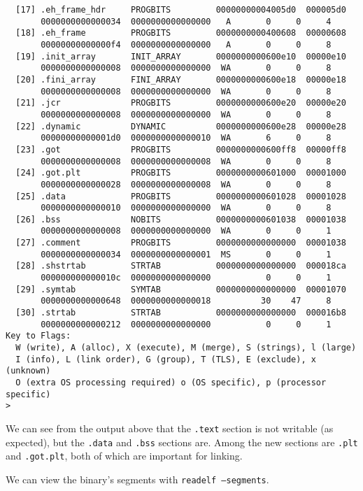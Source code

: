\documentclass{article}
\begin{document}
\begin{lstlisting}
  [17] .eh_frame_hdr     PROGBITS         00000000004005d0  000005d0
       0000000000000034  0000000000000000   A       0     0     4
  [18] .eh_frame         PROGBITS         0000000000400608  00000608
       00000000000000f4  0000000000000000   A       0     0     8
  [19] .init_array       INIT_ARRAY       0000000000600e10  00000e10
       0000000000000008  0000000000000000  WA       0     0     8
  [20] .fini_array       FINI_ARRAY       0000000000600e18  00000e18
       0000000000000008  0000000000000000  WA       0     0     8
  [21] .jcr              PROGBITS         0000000000600e20  00000e20
       0000000000000008  0000000000000000  WA       0     0     8
  [22] .dynamic          DYNAMIC          0000000000600e28  00000e28
       00000000000001d0  0000000000000010  WA       6     0     8
  [23] .got              PROGBITS         0000000000600ff8  00000ff8
       0000000000000008  0000000000000008  WA       0     0     8
  [24] .got.plt          PROGBITS         0000000000601000  00001000
       0000000000000028  0000000000000008  WA       0     0     8
  [25] .data             PROGBITS         0000000000601028  00001028
       0000000000000010  0000000000000000  WA       0     0     8
  [26] .bss              NOBITS           0000000000601038  00001038
       0000000000000008  0000000000000000  WA       0     0     1
  [27] .comment          PROGBITS         0000000000000000  00001038
       0000000000000034  0000000000000001  MS       0     0     1
  [28] .shstrtab         STRTAB           0000000000000000  000018ca
       000000000000010c  0000000000000000           0     0     1
  [29] .symtab           SYMTAB           0000000000000000  00001070
       0000000000000648  0000000000000018          30    47     8
  [30] .strtab           STRTAB           0000000000000000  000016b8
       0000000000000212  0000000000000000           0     0     1
Key to Flags:
  W (write), A (alloc), X (execute), M (merge), S (strings), l (large)
  I (info), L (link order), G (group), T (TLS), E (exclude), x (unknown)
  O (extra OS processing required) o (OS specific), p (processor specific)
> 
\end{lstlisting}

We can see from the output above that the \texttt{.text} section is not writable
(as expected), but the \texttt{.data} and \texttt{.bss} sections are. Among the
new sections are \texttt{.plt} and \texttt{.got.plt}, both of which are
important for linking.

We can view the binary's segments with \texttt{readelf --segments}.
\end{document}
